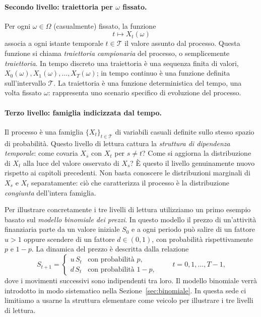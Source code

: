 \paragraph{Secondo livello: traiettoria per $\omega$ fissato.}
Per ogni $\omega\in\Omega$ (casualmente) fissato, la funzione
\[
t \mapsto X_t(\omega)
\]
associa a ogni istante temporale $t \in \mathcal{T}$ il valore assunto dal processo. Questa funzione si chiama \emph{traiettoria
campionaria} del processo, o semplicemente \emph{traiettoria}. In
tempo discreto una traiettoria \`{e} una sequenza finita di valori,
$X_0(\omega),X_1(\omega),\ldots,X_T(\omega)$; in tempo continuo \`{e}
una funzione definita sull'intervallo $\mathcal{T}$. La traiettoria
\`{e} una funzione deterministica del tempo, una volta fissato
$\omega$: rappresenta uno scenario specifico di evoluzione del
processo.

\paragraph{Terzo livello: famiglia indicizzata dal tempo.}
Il processo \`{e} una famiglia $\{X_t\}_{t\in\mathcal{T}}$ di
variabili casuali definite sullo stesso spazio di probabilit\`{a}.
Questo livello di lettura cattura la \emph{struttura di dipendenza
temporale}: come covaria $X_s$ con $X_t$ per $s\neq t$? Come si
aggiorna la distribuzione di $X_t$ alla luce del valore osservato di
$X_s$? \`{E} questo il livello genuinamente nuovo rispetto ai capitoli
precedenti. Non basta conoscere le distribuzioni marginali di $X_s$ e
$X_t$ separatamente: ci\`{o} che caratterizza il processo \`{e} la
distribuzione \emph{congiunta} dell'intera famiglia.

Per illustrare concretamente i tre livelli di lettura utilizziamo un
primo esempio basato sul \emph{modello binomiale dei prezzi}. In
questo modello il prezzo di un'attivit\`{a} finanziaria parte da un
valore iniziale $S_0$ e a ogni periodo pu\`{o} salire di un fattore
$u>1$ oppure scendere di un fattore $d\in(0,1)$, con probabilit\`{a}
rispettivamente $p$ e $1-p$. La dinamica del prezzo \`{e} descritta
dalla relazione
\[
S_{t+1}=\begin{cases}
u\,S_t & \text{con probabilit\`{a} }p,\\
d\,S_t & \text{con probabilit\`{a} }1-p,
\end{cases}
\qquad t=0,1,\ldots,T-1,
\]
dove i movimenti successivi sono indipendenti tra loro. Il modello
binomiale verr\`{a} introdotto in modo sistematico nella
Sezione~\ref{sec:binomiale}. In questa sede ci limitiamo a usarne la
struttura elementare come veicolo per illustrare i tre livelli di
lettura.

